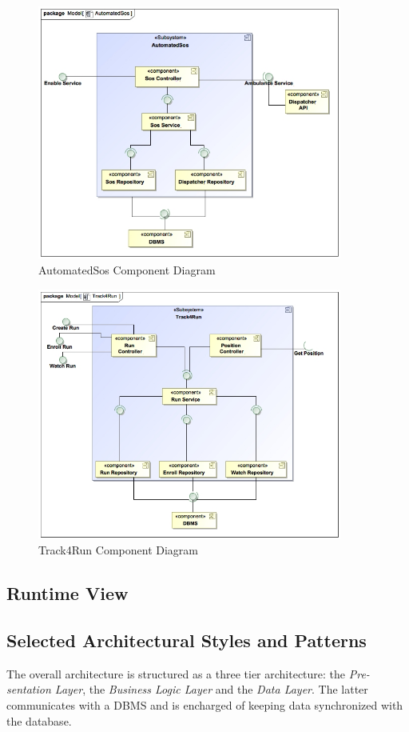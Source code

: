 \documentclass[a4paper]{article}
\begin{document}
\begin{figure}[!htpb]
    \centering
    \includegraphics[width=100mm,keepaspectratio]{DD/images/UML/component_AutomatedSos.jpg}
    \caption{AutomatedSos Component Diagram}
    \label{fig:component_automatedsos}
\end{figure}
\begin{figure}[!htpb]
    \centering
    \includegraphics[width=100mm,keepaspectratio]{DD/images/UML/component_Track4Run.jpg}
    \caption{Track4Run Component Diagram}
    \label{fig:component_track4run}
\end{figure}

\newpage
\subsection{Runtime View}

\newpage
\subsection{Selected Architectural Styles and Patterns}
    The overall architecture is structured as a three tier architecture: the \textit{Pre-\newline sentation Layer}, the \textit{Business Logic Layer} and the \textit{Data Layer}. The latter communicates with a DBMS and is encharged of keeping data synchronized with the database.
    
\end{document}
